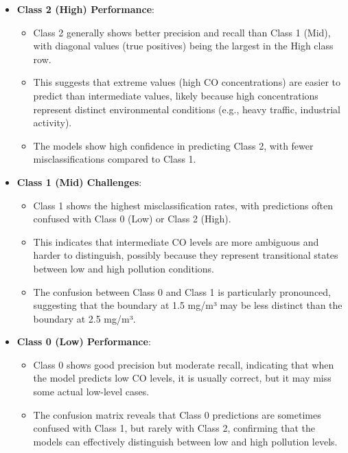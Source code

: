 \documentclass[12pt,a4paper]{article}
\begin{document}
\begin{itemize}
    \item \textbf{Class 2 (High) Performance}:
    \begin{itemize}
        \item Class 2 generally shows better precision and recall than Class 1 (Mid), with diagonal values (true positives) being the largest in the High class row.
        \item This suggests that extreme values (high CO concentrations) are easier to predict than intermediate values, likely because high concentrations represent distinct environmental conditions (e.g., heavy traffic, industrial activity).
        \item The models show high confidence in predicting Class 2, with fewer misclassifications compared to Class 1.
    \end{itemize}
    
    \item \textbf{Class 1 (Mid) Challenges}:
    \begin{itemize}
        \item Class 1 shows the highest misclassification rates, with predictions often confused with Class 0 (Low) or Class 2 (High).
        \item This indicates that intermediate CO levels are more ambiguous and harder to distinguish, possibly because they represent transitional states between low and high pollution conditions.
        \item The confusion between Class 0 and Class 1 is particularly pronounced, suggesting that the boundary at 1.5 mg/m³ may be less distinct than the boundary at 2.5 mg/m³.
    \end{itemize}
    
    \item \textbf{Class 0 (Low) Performance}:
    \begin{itemize}
        \item Class 0 shows good precision but moderate recall, indicating that when the model predicts low CO levels, it is usually correct, but it may miss some actual low-level cases.
        \item The confusion matrix reveals that Class 0 predictions are sometimes confused with Class 1, but rarely with Class 2, confirming that the models can effectively distinguish between low and high pollution levels.
    \end{itemize}
    

\end{itemize}
\end{document}
